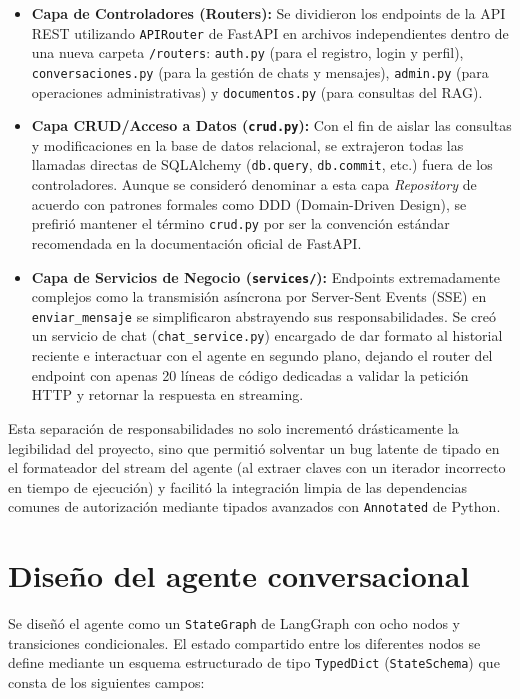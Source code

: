 \documentclass[12pt,a4paper,oneside]{report}
\begin{document}
\begin{itemize}
    \item \textbf{Capa de Controladores (Routers):} Se dividieron los endpoints de la API REST utilizando \texttt{APIRouter} de FastAPI en archivos independientes dentro de una nueva carpeta \texttt{/routers}: \texttt{auth.py} (para el registro, login y perfil), \texttt{conversaciones.py} (para la gestión de chats y mensajes), \texttt{admin.py} (para operaciones administrativas) y \texttt{documentos.py} (para consultas del RAG).
    \item \textbf{Capa CRUD/Acceso a Datos (\texttt{crud.py}):} Con el fin de aislar las consultas y modificaciones en la base de datos relacional, se extrajeron todas las llamadas directas de SQLAlchemy (\texttt{db.query}, \texttt{db.commit}, etc.) fuera de los controladores. Aunque se consideró denominar a esta capa \textit{Repository} de acuerdo con patrones formales como DDD (Domain-Driven Design), se prefirió mantener el término \texttt{crud.py} por ser la convención estándar recomendada en la documentación oficial de FastAPI.
    \item \textbf{Capa de Servicios de Negocio (\texttt{services/}):} Endpoints extremadamente complejos como la transmisión asíncrona por Server-Sent Events (SSE) en \texttt{enviar\_mensaje} se simplificaron abstrayendo sus responsabilidades. Se creó un servicio de chat (\texttt{chat\_service.py}) encargado de dar formato al historial reciente e interactuar con el agente en segundo plano, dejando el router del endpoint con apenas 20 líneas de código dedicadas a validar la petición HTTP y retornar la respuesta en streaming.
\end{itemize}

Esta separación de responsabilidades no solo incrementó drásticamente la legibilidad del proyecto, sino que permitió solventar un bug latente de tipado en el formateador del stream del agente (al extraer claves con un iterador incorrecto en tiempo de ejecución) y facilitó la integración limpia de las dependencias comunes de autorización mediante tipados avanzados con \texttt{Annotated} de Python.

\section{Diseño del agente conversacional}
Se diseñó el agente como un \texttt{StateGraph} de LangGraph con ocho nodos y transiciones condicionales. El estado compartido entre los diferentes nodos se define mediante un esquema estructurado de tipo \texttt{TypedDict} (\texttt{StateSchema}) que consta de los siguientes campos:
\end{document}
